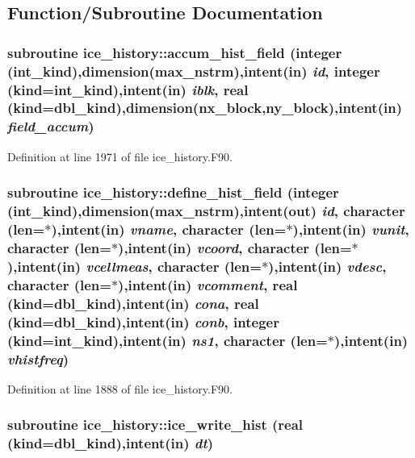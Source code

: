 \subsection{Function/Subroutine Documentation}
\hypertarget{namespaceice__history_a16cf4059a24eed8a2908cecdba018383}{
\subsubsection[{accum\_\-hist\_\-field}]{\setlength{\rightskip}{0pt plus 5cm}subroutine ice\_\-history::accum\_\-hist\_\-field (integer (int\_\-kind),dimension(max\_\-nstrm),intent(in) {\em id}, \/  integer (kind=int\_\-kind),intent(in) {\em iblk}, \/  real (kind=dbl\_\-kind),dimension(nx\_\-block,ny\_\-block),intent(in) {\em field\_\-accum})}}
\label{namespaceice__history_a16cf4059a24eed8a2908cecdba018383}


Definition at line 1971 of file ice\_\-history.F90.\hypertarget{namespaceice__history_a97e4c9d297248bf62ca51169bf82a846}{
\subsubsection[{define\_\-hist\_\-field}]{\setlength{\rightskip}{0pt plus 5cm}subroutine ice\_\-history::define\_\-hist\_\-field (integer (int\_\-kind),dimension(max\_\-nstrm),intent(out) {\em id}, \/  character (len=$\ast$),intent(in) {\em vname}, \/  character (len=$\ast$),intent(in) {\em vunit}, \/  character (len=$\ast$),intent(in) {\em vcoord}, \/  character (len=$\ast$),intent(in) {\em vcellmeas}, \/  character (len=$\ast$),intent(in) {\em vdesc}, \/  character (len=$\ast$),intent(in) {\em vcomment}, \/  real (kind=dbl\_\-kind),intent(in) {\em cona}, \/  real (kind=dbl\_\-kind),intent(in) {\em conb}, \/  integer (kind=int\_\-kind),intent(in) {\em ns1}, \/  character (len=$\ast$),intent(in) {\em vhistfreq})}}
\label{namespaceice__history_a97e4c9d297248bf62ca51169bf82a846}


Definition at line 1888 of file ice\_\-history.F90.\hypertarget{namespaceice__history_a09981e8df56a439fdddc4fcbb1066ecd}{
\subsubsection[{ice\_\-write\_\-hist}]{\setlength{\rightskip}{0pt plus 5cm}subroutine ice\_\-history::ice\_\-write\_\-hist (real (kind=dbl\_\-kind),intent(in) {\em dt})}}
\label{namespaceice__history_a09981e8df56a439fdddc4fcbb1066ecd}


